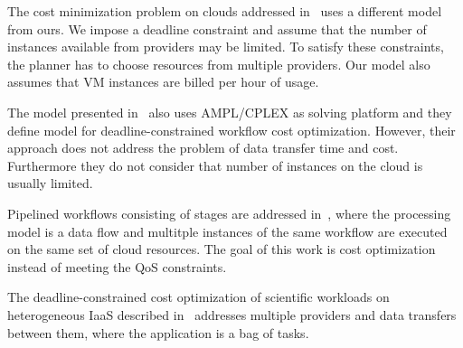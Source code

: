 The cost minimization problem on clouds addressed in~\cite{Pandey2010} uses a different model from ours. We impose a deadline constraint and assume that the number of instances available from providers may be limited. To satisfy these constraints, the planner has to choose resources from multiple providers. Our model also assumes that VM instances are billed per hour of usage.

The model presented in~\cite{Genez2012} also uses AMPL/CPLEX as solving platform and they define model for deadline-constrained workflow cost optimization. However, their approach does not address the problem of data transfer time and cost. Furthermore they do not consider that number of instances on the cloud is usually limited. 

Pipelined workflows consisting of stages are addressed in~\cite{TolosanaCalasanz20121300}, where the processing model is a data flow and multitple instances of the same workflow are executed on the same set of cloud resources. The goal of this work is cost optimization instead of meeting the QoS constraints.



The deadline-constrained cost optimization of scientific workloads on heterogeneous IaaS described in~\cite{VandenBossche2013973} addresses multiple providers and data transfers between them, where the application is a bag of tasks.
